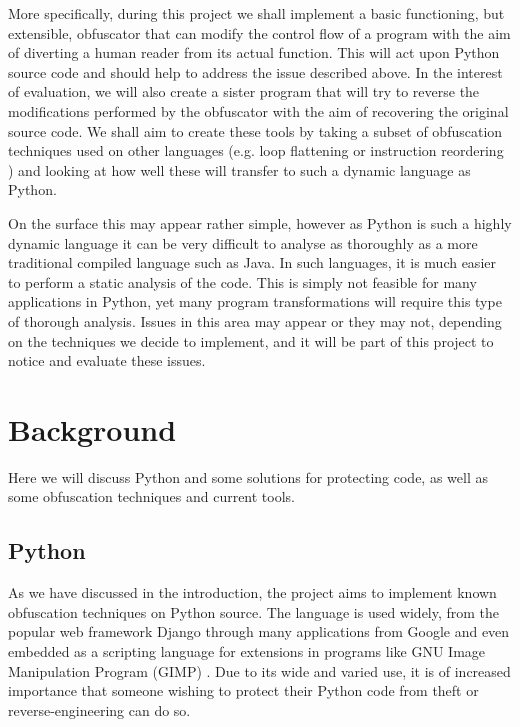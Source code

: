 \documentclass{report}
\begin{document}
More specifically, during this project we shall implement a basic functioning, but extensible, obfuscator
that can modify the control flow of a program with the aim of diverting a human reader from its actual
function. This will act upon Python source code and should help to address the issue described above.
In the interest of evaluation, we will also create a sister program that will try to reverse the modifications performed by the
obfuscator with the aim of recovering the original source code. 
We shall aim to create these tools by taking a subset of obfuscation techniques used on other languages (e.g.
loop flattening or instruction reordering \cite{taxobftrans}) and looking at how well these will transfer to such a dynamic language as Python.

On the surface this may appear rather simple, however as Python is such a highly dynamic language it can be very difficult to analyse
\cite[p13]{staticanal} as thoroughly as a more traditional compiled language such as Java. In such languages, it is much easier to perform a static
analysis of the code. This is simply not feasible for many applications in Python, yet many program transformations will require this type of
thorough analysis. Issues in this area may appear or they may not, depending on the techniques we decide to implement, and it will be part of
this project to notice and evaluate these issues.

\section{Background}

Here we will discuss Python and some solutions for protecting code, as well as some obfuscation techniques
and current tools.

\subsection{Python}

As we have discussed in the introduction, the project aims to implement known obfuscation techniques on Python source.
The language is used widely, from the popular web framework Django \cite{django} through many applications
from Google \cite{pygoogle} and even embedded as a scripting language for extensions in programs like GNU
Image Manipulation Program (GIMP) \cite{gimp}. Due to its wide and varied use, it is of increased importance
that someone wishing to protect their Python code from theft or reverse-engineering can do so.
\end{document}
